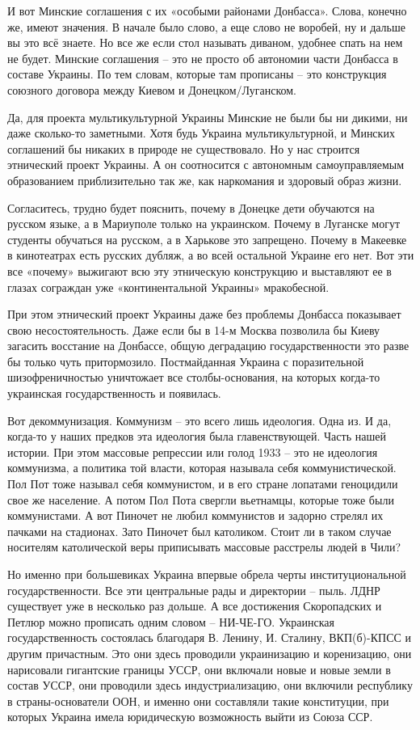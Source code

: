 И вот Минские соглашения с их «особыми районами Донбасса». Слова, конечно же,
имеют значения. В начале было слово, а еще слово не воробей, ну и дальше вы это
всё знаете. Но все же если стол называть диваном, удобнее спать на нем не
будет. Минские соглашения – это не просто об автономии части Донбасса в составе
Украины. По тем словам, которые там прописаны – это конструкция союзного
договора между Киевом и Донецком/Луганском.

Да, для проекта мультикультурной Украины Минские не были бы ни дикими, ни даже
сколько-то заметными. Хотя будь Украина мультикультурной, и Минских соглашений
бы никаких в природе не существовало. Но у нас строится этнический проект
Украины. А он соотносится с автономным самоуправляемым образованием
приблизительно так же, как наркомания и здоровый образ жизни.

Согласитесь, трудно будет пояснить, почему в Донецке дети обучаются на русском
языке, а в Мариуполе только на украинском. Почему в Луганске могут студенты
обучаться на русском, а в Харькове это запрещено. Почему в Макеевке в
кинотеатрах есть русских дубляж, а во всей остальной Украине его нет. Вот эти
все «почему» выжигают всю эту этническую конструкцию и выставляют ее в глазах
сограждан уже «континентальной Украины» мракобесной.

При этом этнический проект Украины даже без проблемы Донбасса показывает свою
несостоятельность. Даже если бы в 14-м Москва позволила бы Киеву загасить
восстание на Донбассе, общую деградацию государственности это разве бы только
чуть притормозило. Постмайданная Украина с поразительной шизофреничностью
уничтожает все столбы-основания, на которых когда-то украинская
государственность и появилась.

Вот декоммунизация. Коммунизм – это всего лишь идеология. Одна из. И да,
когда-то у наших предков эта идеология была главенствующей. Часть нашей
истории. При этом массовые репрессии или голод 1933 – это не идеология
коммунизма, а политика той власти, которая называла себя коммунистической. Пол
Пот тоже называл себя коммунистом, и в его стране лопатами геноцидили свое же
население. А потом Пол Пота свергли вьетнамцы, которые тоже были коммунистами.
А вот Пиночет не любил коммунистов и задорно стрелял их пачками на стадионах.
Зато Пиночет был католиком. Стоит ли в таком случае носителям католической веры
приписывать массовые расстрелы людей в Чили?

Но именно при большевиках Украина впервые обрела черты институциональной
государственности. Все эти центральные рады и директории – пыль. ЛДНР
существует уже в несколько раз дольше. А все достижения Скоропадских и Петлюр
можно прописать одним словом – НИ-ЧЕ-ГО. Украинская государственность
состоялась благодаря В. Ленину, И. Сталину, ВКП(б)-КПСС и другим причастным.
Это они здесь проводили украинизацию и коренизацию, они нарисовали гигантские
границы УССР, они включали новые и новые земли в состав УССР, они проводили
здесь индустриализацию, они включили республику в страны-основатели ООН, и
именно они составляли такие конституции, при которых Украина имела юридическую
возможность выйти из Союза ССР.

